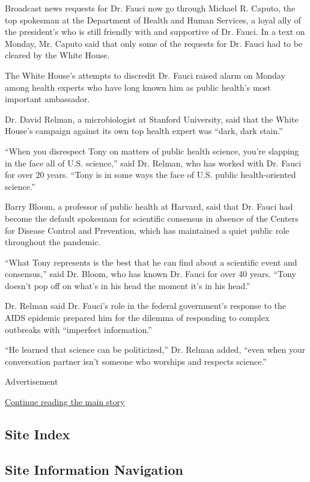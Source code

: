 Broadcast news requests for Dr. Fauci now go through Michael R. Caputo,
the top spokesman at the Department of Health and Human Services, a
loyal ally of the president's who is still friendly with and supportive
of Dr. Fauci. In a text on Monday, Mr. Caputo said that only some of the
requests for Dr. Fauci had to be cleared by the White House.

The White House's attempts to discredit Dr. Fauci raised alarm on Monday
among health experts who have long known him as public health's most
important ambassador.

Dr. David Relman, a microbiologist at Stanford University, said that the
White House's campaign against its own top health expert was ``dark,
dark stain.''

``When you disrespect Tony on matters of public health science, you're
slapping in the face all of U.S. science,'' said Dr. Relman, who has
worked with Dr. Fauci for over 20 years. ``Tony is in some ways the face
of U.S. public health-oriented science.''

Barry Bloom, a professor of public health at Harvard, said that Dr.
Fauci had become the default spokesman for scientific consensus in
absence of the Centers for Disease Control and Prevention, which has
maintained a quiet public role throughout the pandemic.

``What Tony represents is the best that he can find about a scientific
event and consensus,'' said Dr. Bloom, who has known Dr. Fauci for over
40 years. ``Tony doesn't pop off on what's in his head the moment it's
in his head.''

Dr. Relman said Dr. Fauci's role in the federal government's response to
the AIDS epidemic prepared him for the dilemma of responding to complex
outbreaks with ``imperfect information.''

``He learned that science can be politicized,'' Dr. Relman added, ``even
when your conversation partner isn't someone who worships and respects
science.''

Advertisement

\protect\hyperlink{after-bottom}{Continue reading the main story}

\hypertarget{site-index}{%
\subsection{Site Index}\label{site-index}}

\hypertarget{site-information-navigation}{%
\subsection{Site Information
Navigation}\label{site-information-navigation}}

